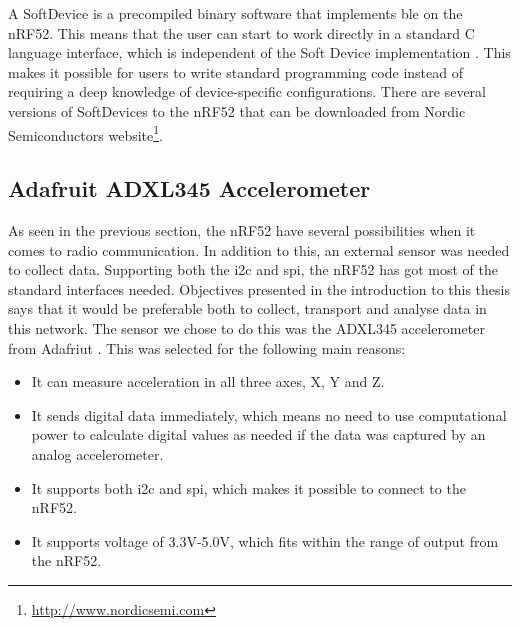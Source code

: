 



\noindent A SoftDevice is a precompiled binary software that implements \gls{ble} on the nRF52. This means that the user can start to work directly in a standard C language interface, which is independent of the Soft Device implementation \cite{softDevice}. This makes it possible for users to write standard programming code instead of requiring a deep knowledge of device-specific configurations. There are several versions of SoftDevices to the nRF52 that can be downloaded from Nordic Semiconductors website\footnote{\url{http://www.nordicsemi.com}}. 


\subsection{Adafruit ADXL345 Accelerometer}

\noindent As seen in the previous section, the nRF52 have several possibilities when it comes to radio communication. In addition to this, an external sensor was needed to collect data. Supporting both the \gls{i2c} and \gls{spi}, the nRF52 has got most of the standard interfaces needed. Objectives presented in the introduction to this thesis says that it would be preferable both to collect, transport and analyse data in this network. The sensor we chose to do this was the ADXL345 accelerometer from Adafriut \cite{adxlDataSheet}. This was selected for the following main reasons:  

\begin{itemize}
  \item It can measure acceleration in all three axes, X, Y and Z.
  \item It sends digital data immediately, which means no need to use computational power to calculate digital values as needed if the data was captured by an analog accelerometer. 
  \item It supports both \gls{i2c} and \gls{spi}, which makes it possible to connect to the nRF52. 
  \item It supports voltage of 3.3V-5.0V, which fits within the range of output from the nRF52.  
\end{itemize}



